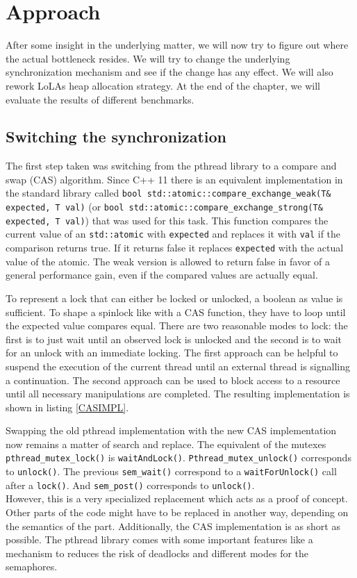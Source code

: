 

\chapter{Approach}
After some insight in the underlying matter, we will now try to figure out where the actual bottleneck resides. We will try to change the underlying synchronization mechanism and see if the change has any effect. We will also rework LoLAs heap allocation strategy. At the end of the chapter, we will evaluate the results of different benchmarks.

\section{Switching the synchronization}
The first step taken was switching from the pthread library to a compare and swap (CAS) algorithm. Since C++ 11 there is an equivalent implementation in the standard library called \texttt{bool std::atomic::compare\_exchange\_weak(T\& expected, T val)} (or \texttt{bool std::atomic::compare\_exchange\_strong(T\& expected, T val)}) that was used for this task. This function compares the current value of an \texttt{std::atomic} with \texttt{expected} and replaces it with \texttt{val} if the comparison returns true. If it returns false it replaces \texttt{expected} with the actual value of the atomic. The weak version is allowed to return false in favor of a general performance gain, even if the compared values are actually equal.

To represent a lock that can either be locked or unlocked, a boolean as value is sufficient. To shape a spinlock like with a CAS function, they have to loop until the expected value compares equal. There are two reasonable modes to lock: the first is to just wait until an observed lock is unlocked and the second is to wait for an unlock with an immediate locking. The first approach can be helpful to suspend the execution of the current thread until an external thread is signalling a continuation. The second approach can be used to block access to a resource until all necessary manipulations are completed. The resulting implementation is shown in listing \ref{CASIMPL}.

Swapping the old pthread implementation with the new CAS implementation now remains a matter of search and replace. The equivalent of the mutexes \texttt{pthread\-\_mutex\-\_lock()} is \texttt{waitAndLock()}. \texttt{Pthread\_mutex\_unlock()} corresponds to \texttt{unlock()}. The previous \texttt{sem\_wait()} correspond to a \texttt{waitForUnlock()} call after a \texttt{lock()}. And \texttt{sem\_post()} corresponds to \texttt{unlock()}.\\
However, this is a very specialized replacement which acts as a proof of concept. Other parts of the code might have to be replaced in another way, depending on the semantics of the part. Additionally, the CAS implementation is as short as possible. The pthread library comes with some important features like a mechanism to reduces the risk of deadlocks and different modes for the semaphores.

